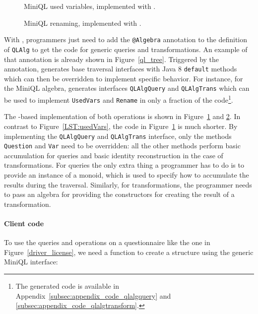\begin{figure}[t]
\nocaptionrule
\caption{MiniQL used variables, implemented with \Name.}
\label{usedvars_with_oaframework}
\end{figure}

\begin{figure}
\nocaptionrule
\caption{MiniQL renaming, implemented with  \Name.}
\label{rename_with_oaframework}
\end{figure}

With \Name, programmers just need to add the \lstinline{@Algebra} annotation
to the definition of \lstinline{QLAlg} to get the code for generic
queries and transformations. An example of that annotation is already
shown in Figure~\ref{ql_tree}.
Triggered by the annotation, \name generates base traversal interfaces with Java 8 \lstinline{default} methods which can then be overridden to implement specific behavior.
For instance, for the MiniQL algebra, \name generates interfaces
\lstinline{QLAlgQuery} and
\lstinline{QLAlgTrans} which can be used to implement \lstinline{UsedVars} and \lstinline{Rename} in only a fraction of the code\footnote{The generated code is available in Appendix~\ref{subsec:appendix_code_qlalgquery} and \ref{subsec:appendix_code_qlalgtransform}.}.

The \name-based implementation of both operations is shown in
Figure~\ref{usedvars_with_oaframework} and
\ref{rename_with_oaframework}. In contrast to Figure~\ref{LST:usedVars}, the
code in Figure~\ref{usedvars_with_oaframework} is much shorter.
By implementing the
\lstinline{QLAlgQuery} and \lstinline{QLAlgTrans} interface, only the
methods \lstinline{Question} and \lstinline{Var} need to be
overridden: all the other methods perform basic accumulation for
queries and basic identity reconstruction in the case of
transformations.  For queries the only extra thing a programmer
has to do is to provide an instance of a monoid, which is used to
specify how to accumulate the results during the traversal. Similarly,
for transformations, the programmer needs to pass an algebra for
providing the constructors for creating the result of a
transformation.

\paragraph{Client code}
To use the queries and operations on a questionnaire like the one in Figure~\ref{driver_license}, we need a function to create a structure using the generic MiniQL interface:

